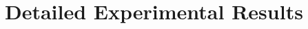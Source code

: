 \documentclass{article}
\begin{document}
    
    
        
        
        
            
            

    
        
        
        


\clearpage
\section{Detailed Experimental Results}
\end{document}
